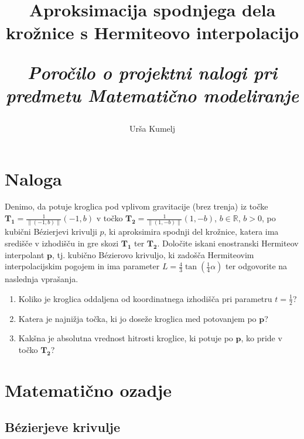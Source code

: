 \documentclass[a4paper,12pt]{article}
\title{\textbf{\huge Aproksimacija spodnjega dela krožnice s Hermiteovo interpolacijo}
	
	\Large \it Poročilo o projektni nalogi pri predmetu Matematično modeliranje}
\author{Urša Kumelj}
\begin{document}
	
	\maketitle
	
	\tableofcontents

	\newpage

	\section{Naloga}
	Denimo, da potuje kroglica pod vplivom gravitacije (brez trenja) iz točke $\boldsymbol{T_1} = \frac{1}{\| (-1,b) \|} (-1,b)$ v točko $\boldsymbol{T_2} = \frac{1}{\|(1,-b)\|}(1,-b)$, $b \in \mathbb{R}$, $b>0$, po
	kubični B\'{e}zierjevi krivulji $p$, ki aproksimira spodnji del krožnice, katera
	ima središče v izhodišču in gre skozi $\boldsymbol{T_1}$ ter $\boldsymbol{T_2}$. Določite iskani enostranski Hermiteov interpolant $\boldsymbol{p}$, tj. kubično B\'{e}zierovo krivuljo, ki zadošča Hermiteovim interpolacijskim pogojem in ima parameter 
	$L = \frac{4}{3} \tan(\frac{1}{4}\alpha)$ ter odgovorite na naslednja vprašanja.
	\begin{enumerate}[label=(\alph*)]
		\item Koliko je kroglica oddaljena od koordinatnega izhodišča pri parametru $t = \frac{1}{2}$?
		\item Katera je najnižja točka, ki jo doseže kroglica med potovanjem po $\boldsymbol{p}$?
		\item Kakšna je absolutna vrednost hitrosti kroglice, ki potuje po $\boldsymbol{p}$, ko
		pride v točko $\boldsymbol{T_2}$?

	\end{enumerate}

	
	\section{Matematično ozadje}
	
	\subsection{B\'{e}zierjeve krivulje}
	
\end{document}
